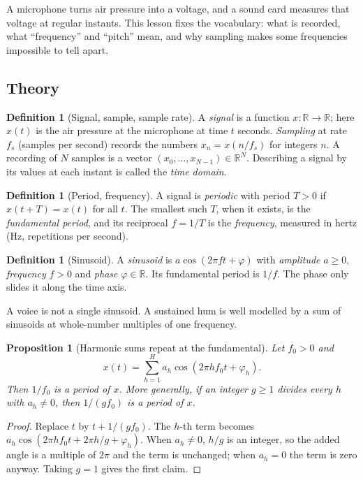 \documentclass[11pt]{article}
\newtheorem{proposition}[theorem]{Proposition}
\theoremstyle{definition}
\newtheorem{definition}[theorem]{Definition}
\newcommand{\R}{\mathbb{R}}
\begin{document}
A microphone turns air pressure into a voltage, and a sound card measures that voltage
at regular instants. This lesson fixes the vocabulary: what is recorded, what
``frequency'' and ``pitch'' mean, and why sampling makes some frequencies impossible to
tell apart.

\subsection{Theory}

\begin{definition}[Signal, sample, sample rate]
A \emph{signal} is a function $x:\R\to\R$; here $x(t)$ is the air pressure at the
microphone at time $t$ seconds. \emph{Sampling} at rate $f_s$ (samples per second)
records the numbers $x_n=x(n/f_s)$ for integers $n$. A recording of $N$ samples is a
vector $(x_0,\dots,x_{N-1})\in\R^N$. Describing a signal by its values at each instant
is called the \emph{time domain}.
\end{definition}

\begin{definition}[Period, frequency]
A signal is \emph{periodic} with period $T>0$ if $x(t+T)=x(t)$ for all $t$. The
smallest such $T$, when it exists, is the \emph{fundamental period}, and its
reciprocal $f=1/T$ is the \emph{frequency}, measured in hertz (Hz, repetitions per
second).
\end{definition}

\begin{definition}[Sinusoid]
A \emph{sinusoid} is $a\cos(2\pi f t+\varphi)$ with \emph{amplitude} $a\ge0$,
\emph{frequency} $f>0$ and \emph{phase} $\varphi\in\R$. Its fundamental period is
$1/f$. The phase only slides it along the time axis.
\end{definition}

A voice is not a single sinusoid. A sustained hum is well modelled by a sum of
sinusoids at whole-number multiples of one frequency.

\begin{proposition}[Harmonic sums repeat at the fundamental]\label{prop:harmperiod}
Let $f_0>0$ and
\[
x(t)=\sum_{h=1}^{H}a_h\cos(2\pi h f_0 t+\varphi_h).
\]
Then $1/f_0$ is a period of $x$. More generally, if an integer $g\ge1$ divides every
$h$ with $a_h\neq0$, then $1/(gf_0)$ is a period of $x$.
\end{proposition}
\begin{proof}
Replace $t$ by $t+1/(gf_0)$. The $h$-th term becomes
$a_h\cos(2\pi hf_0t+2\pi h/g+\varphi_h)$. When $a_h\ne0$, $h/g$ is an integer, so the
added angle is a multiple of $2\pi$ and the term is unchanged; when $a_h=0$ the term is
zero anyway. Taking $g=1$ gives the first claim.
\end{proof}
\end{document}
